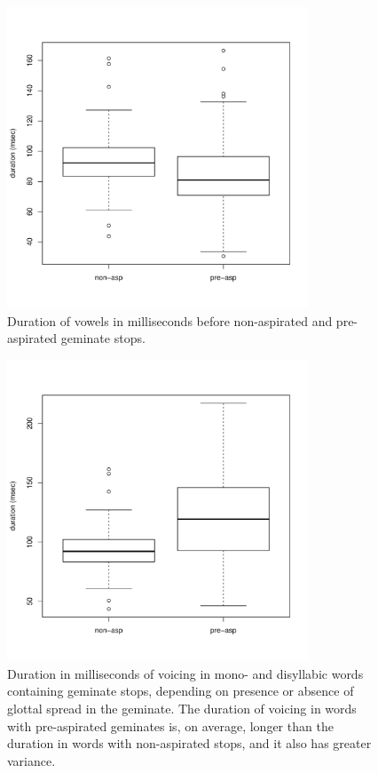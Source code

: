 \documentclass[11pt,a4paper,openany]{memoir}\usepackage[]{graphicx}\usepackage[]{color}
\newenvironment{knitrout}{}{} %
\begin{document}
\begin{figure}
\centering
\begin{knitrout}
\color{fgcolor}
\includegraphics[width=0.8\textwidth]{img/vow-stop-1} 

\end{knitrout}
\caption{Duration of vowels in milliseconds before non-aspirated and pre-aspirated geminate stops.
}
\label{f:absvow}
\end{figure}

\begin{figure}
\centering
\begin{knitrout}
\color{fgcolor}
\includegraphics[width=0.8\textwidth]{img/voicing-stop-1} 

\end{knitrout}
\caption{Duration in milliseconds of voicing in mono- and disyllabic words containing geminate stops, depending on presence or absence of glottal spread in the geminate.
The duration of voicing in words with pre-aspirated geminates is, on average, longer than the duration in words with non-aspirated stops, and it also has greater variance.
}
\label{f:voicdur}
\end{figure}
\end{document}
